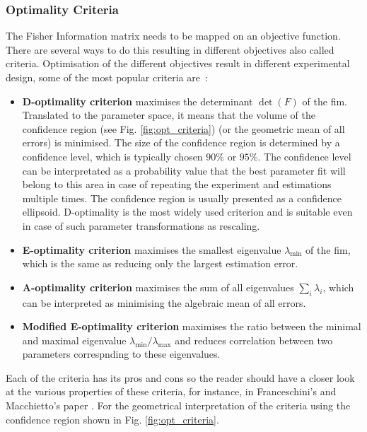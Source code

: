 \documentclass[10pt,A4paper]{article}
\begin{document}
\subsubsection*{Optimality Criteria}
The Fisher Information matrix needs to be mapped on an objective function. There are several ways to do this resulting in different objectives also called criteria.
Optimisation of the different objectives result in different experimental design, some of the most popular criteria are~\cite{balsa-cantoe.bangaj.r.COMPUTINGOPTIMALDYNAMIC2008, dette_designing_1997, walter_qualitative_1990}:
\begin{itemize}
\item \textbf{D-optimality criterion} maximises the determinant $\det (F)$ of the \ac{fim}. 
 Translated to the parameter space, it means that the volume of the confidence region (see Fig. \ref{fig:opt_criteria}) (or the geometric mean of all errors) is minimised.
 The size of the confidence region is determined by a confidence level, which is typically chosen $90 \%$ or $95 \%$.
 The confidence level can be interpretated as a probability value that the best 
 parameter fit will belong to this area in case of repeating the experiment and estimations multiple times.
 The confidence region is usually presented as a confidence ellipsoid. 
 D-optimality is the most widely used criterion and is suitable even in case of such parameter transformations as rescaling.
\item \textbf{E-optimality criterion} maximises the smallest eigenvalue $\lambda_{\min}$ of the \ac{fim}, which is the same as reducing only the largest estimation error.
\item \textbf{A-optimality criterion} maximises the sum of all eigenvalues $\sum_i \lambda_i$, which can be interpreted as minimising the algebraic mean of all errors.
\item \textbf{Modified E-optimality criterion} maximises the ratio between the minimal and maximal eigenvalue $\lambda_{\min} / \lambda_{\max}$ and reduces correlation between two parameters correspnding to these eigenvalues.
 
\end{itemize}
Each of the criteria has its pros and cons so the reader should have a closer look at the various properties of these criteria, for instance, in Franceschini's and Macchietto's paper \cite{franceschiniModelbasedDesignExperiments2008}.
For the geometrical interpretation of the criteria using the confidence region shown in Fig. \ref{fig:opt_criteria}.
\end{document}
